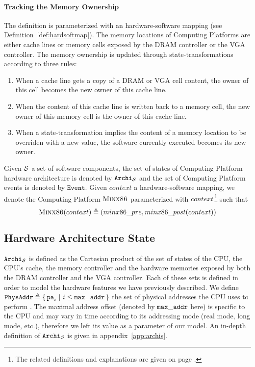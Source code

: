 \paragraph{Tracking the Memory Ownership} The  definition is
parameterized with an hardware-software mapping (see
Definition~\ref{def:hardsoftmap}). The memory locations of 
Computing Platforms are either cache lines or memory cells exposed by the DRAM
controller or the VGA controller. The memory ownership is updated through
state-transformations according to three rules:
\begin{enumerate}
\item When a cache line gets a copy of a DRAM or VGA cell content, the owner of
  this cell becomes the new owner of this cache line.
\item When the content of this cache line is written back to a memory cell, the
  new owner of this memory cell is the owner of this cache line.
\item When a state-transformation implies the content of a memory location to be
  overriden with a new value, the software currently executed becomes its new
  owner.
\end{enumerate}

Given $\mathcal{S}$ a set of software components, the set of states of
 Computing Platform hardware architecture is denoted by
$\texttt{Archi}_{\mathcal{S}}$ and the set of  Computing Platform
events is denoted by $\texttt{Event}$. Given $context$ a hardware-software
mapping, we denote the Computing Platform $\textsc{Minx86}$ parameterized
with $context$\,\footnote{The related definitions and explanations are given on
  page \pageref{page:minx86def}.} such that
\[ \textsc{Minx86}(context) \triangleq (minx86\_pre,
  minx86\_post(context)) \]

\subsection{Hardware Architecture State}

$\texttt{Archi}_{\mathcal{S}}$ is defined as the Cartesian product of the set of
states of the CPU, the CPU's cache, the memory controller and the hardware
memories exposed by both the DRAM controller and the VGA controller. Each of
these sets is defined in order to model the hardware features we have previously
described. We define
$\texttt{PhysAddr} \triangleq \{\,\mathtt{pa}_i\ |\ i \leq \mathtt{max\_addr}\,\}$ the
set of physical addresses the CPU uses to perform \IO. The maximal address
offset (denoted by $\mathtt{max\_addr}$ here) is specific to the CPU and may vary
in time according to its addressing mode (real mode, long mode, etc.), therefore
we left its value as a parameter of our model.  An in-depth definition of
$\texttt{Archi}_{\mathcal{S}}$ is given in appendix~\ref{app:archis}.


